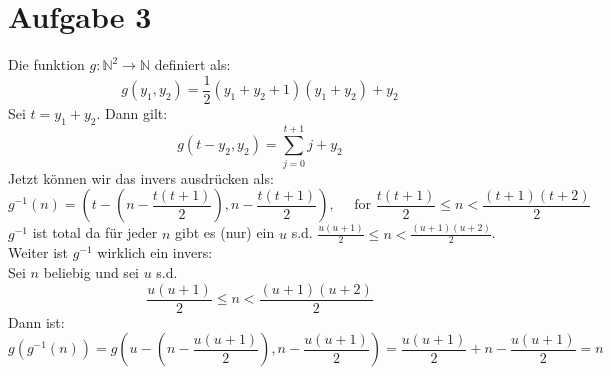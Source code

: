 \documentclass[12pt]{article}
\begin{document}
\section*{Aufgabe 3}
Die funktion $g: \mathbb{N}^2 \rightarrow \mathbb{N}$ definiert als:
\begin{equation}
g(y_1, y_2) = \frac{1}{2} (y_1 + y_2 + 1)(y_1 + y_2) + y_2
\end{equation}
Sei $t = y_1 + y_2$. Dann gilt:
\begin{equation}
g(t - y_2, y_2) = \sum_{j=0}^{t+1}j + y_2
\end{equation}
Jetzt können wir das invers ausdrücken als:
\begin{equation*}
g^{-1}(n) = (t - (n - \frac{t(t+1)}{2}),  n - \frac{t(t+ 1)}{2} ), \quad \mbox{ for }  \frac{t(t+1)}{2} \leq n < \frac{(t+1)(t+2)}{2}
\end{equation*}
$g^{-1}$ ist total da für jeder $n$ gibt es (nur) ein $u$ s.d. $\frac{u(u+1)}{2} \leq n < \frac{(u + 1)(u + 2)}{2}$. Weiter ist $g^{-1}$ wirklich ein invers:\\
Sei $n$ beliebig und sei $u$ s.d.
\begin{equation}
  \frac{u(u+1)}{2} \leq n < \frac{(u+1)(u+2)}{2}
\end{equation}
Dann ist:
\begin{equation}
  g(g^{-1}(n)) = g(u - (n - \frac{u(u+1)}{2}),  n - \frac{u(u+1)}{2}) = \frac{u(u+1)}{2} + n - \frac{u(u+1)}{2} =  n
\end{equation}
\end{document}
